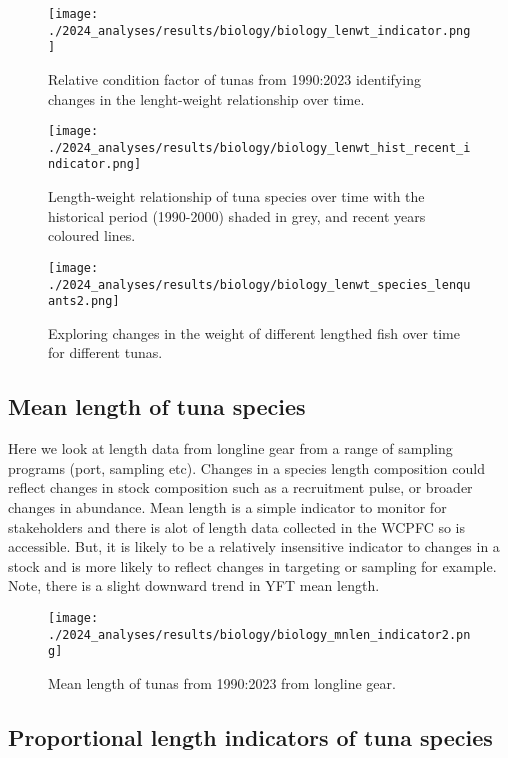 \documentclass[
]{article}
\begin{document}
\begin{figure}
\centering
\texttt{[image: ./2024\_analyses/results/biology/biology\_lenwt\_indicator.png]}
\caption{Relative condition factor of tunas from 1990:2023 identifying
changes in the lenght-weight relationship over time.}
\end{figure}

\begin{figure}
\centering
\texttt{[image: ./2024\_analyses/results/biology/biology\_lenwt\_hist\_recent\_indicator.png]}
\caption{Length-weight relationship of tuna species over time with the
historical period (1990-2000) shaded in grey, and recent years coloured
lines.}
\end{figure}

\begin{figure}
\centering
\texttt{[image: ./2024\_analyses/results/biology/biology\_lenwt\_species\_lenquants2.png]}
\caption{Exploring changes in the weight of different lengthed fish over
time for different tunas.}
\end{figure}

\clearpage

\hypertarget{mean-length-of-tuna-species}{%
\subsection{Mean length of tuna
species}\label{mean-length-of-tuna-species}}

Here we look at length data from longline gear from a range of sampling
programs (port, sampling etc). Changes in a species length composition
could reflect changes in stock composition such as a recruitment pulse,
or broader changes in abundance. Mean length is a simple indicator to
monitor for stakeholders and there is alot of length data collected in
the WCPFC so is accessible. But, it is likely to be a relatively
insensitive indicator to changes in a stock and is more likely to
reflect changes in targeting or sampling for example. Note, there is a
slight downward trend in YFT mean length.

\begin{figure}
\centering
\texttt{[image: ./2024\_analyses/results/biology/biology\_mnlen\_indicator2.png]}
\caption{Mean length of tunas from 1990:2023 from longline gear.}
\end{figure}

\clearpage

\hypertarget{proportional-length-indicators-of-tuna-species}{%
\subsection{Proportional length indicators of tuna
species}\label{proportional-length-indicators-of-tuna-species}}
\end{document}
